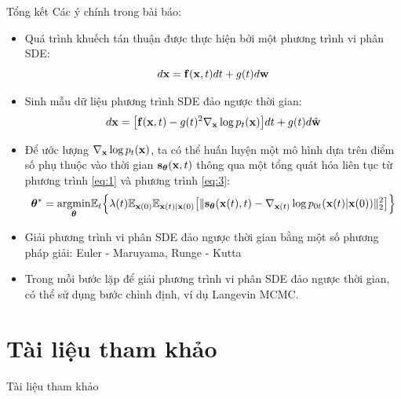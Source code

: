 \documentclass[10pt]{beamer}
\theoremstyle{remark}
\numberwithin{algocf}{section}
\numberwithin{equation}{section}
\numberwithin{dl}{section}
\numberwithin{figure}{section}
\begin{document}
\begin{frame}[shrink]{Tổng kết}
	Các ý chính trong bài báo:
	\begin{itemize}
		\item Quá trình khuếch tán thuận được thực hiện bởi một phương trình vi phân SDE:
		\begin{equation*}
			d \bold{x} = \bold{f} (\bold{x}, t) dt + g(t) d \bold{w}
		\end{equation*}
		\item Sinh mẫu dữ liệu phương trình SDE đảo ngược thời gian:
		\begin{equation*}
			d \bold{x} = \big \lbrack \bold{f}(\bold{x}, t) - g(t)^2 \nabla_{\bold{x}} \log p_t (\bold{x}) \big \rbrack dt + g(t) d \hat{\bold{w}}
		\end{equation*}
		\item Để ước lượng $\nabla_{\bold{x}} \log p_t(\bold{x})$, ta có thể huấn luyện một mô hình dựa trên điểm số phụ thuộc vào thời gian $\bold{s}_{\boldsymbol{\theta}}(\bold{x}, t)$ thông qua một tổng quát hóa liên tục từ phương trình \ref{eq:1} và phương trình \ref{eq:3}:
		\begin{equation*}
			\boldsymbol{\theta}^{\ast} = \underset{\boldsymbol{\theta}}{\mathrm{argmin}} \mathbb{E}_t \Big \lbrace  \lambda(t) \mathbb{E}_{\bold{x}(0)} \mathbb{E}_{\bold{x}(t) \vert \bold{x}(0)} \big \lbrack \lVert \bold{s}_{\boldsymbol{\theta}} (\bold{x}(t), t) - \nabla_{\bold{x}(t)} \log p_{0t} (\bold{x}(t) \vert \bold{x}(0)) \rVert_2^2 \big \rbrack \Big \rbrace
		\end{equation*}
		\item Giải phương trình vi phân SDE đảo ngược thời gian bằng một số phương pháp giải: Euler - Maruyama, Runge - Kutta
		\item Trong mỗi bước lặp để giải phương trình vi phân SDE đảo ngược thời gian, có thể sử dụng bước chỉnh định, ví dụ Langevin MCMC.
	\end{itemize}
\end{frame}

\section{Tài liệu tham khảo}
\begin{frame}[allowframebreaks]{Tài liệu tham khảo}
    \printbibliography
\end{frame}
\end{document}
